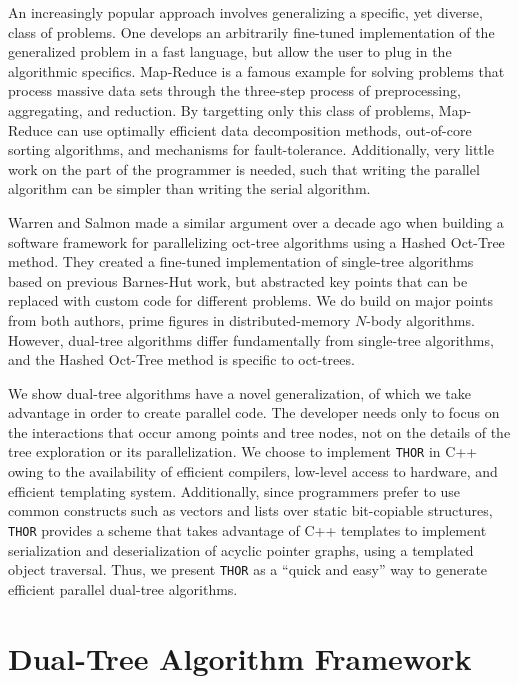 \documentclass[twoside,leqno,twocolumn]{article}
\newcommand{\THOR}{{{\tt THOR}} }
\begin{document}
An increasingly popular approach involves generalizing a specific, yet diverse, class of problems.
One develops an arbitrarily fine-tuned implementation of the generalized problem in a fast language, but allow the user to plug in the algorithmic specifics.
Map-Reduce\cite{mapreduce} is a famous example for solving problems that process massive data sets through the three-step process of preprocessing, aggregating, and reduction.
By targetting only this class of problems, Map-Reduce can use optimally efficient data decomposition methods, out-of-core sorting algorithms, and mechanisms for fault-tolerance.
Additionally, very little work on the part of the programmer is needed, such that writing the parallel algorithm can be simpler than writing the serial algorithm.

Warren and Salmon\cite{warren95portable} made a similar argument over a decade ago when building a software framework for parallelizing oct-tree algorithms using a Hashed Oct-Tree method.
They created a fine-tuned implementation of single-tree algorithms based on previous Barnes-Hut work, but abstracted key points that can be replaced with custom code for different problems.
We do build on major points from both authors, prime figures in distributed-memory $N$-body algorithms.
However, dual-tree algorithms differ fundamentally from single-tree algorithms, and the Hashed Oct-Tree method is specific to oct-trees.

We show dual-tree algorithms have a novel generalization, of which we take advantage in order to create parallel code.
The developer needs only to focus on the interactions that occur among points and tree nodes, not on the details of the tree exploration or its parallelization.
We choose to implement \THOR in C++ owing to the availability of efficient compilers, low-level access to hardware, and efficient templating system.
Additionally, since programmers prefer to use common constructs such as vectors and lists over static bit-copiable structures, \THOR provides a scheme that takes advantage of C++ templates to implement serialization and deserialization of acyclic pointer graphs, using a templated object traversal.
Thus, we present \THOR as a ``quick and easy'' way to generate efficient parallel dual-tree algorithms.

\section{Dual-Tree Algorithm Framework}
\end{document}
